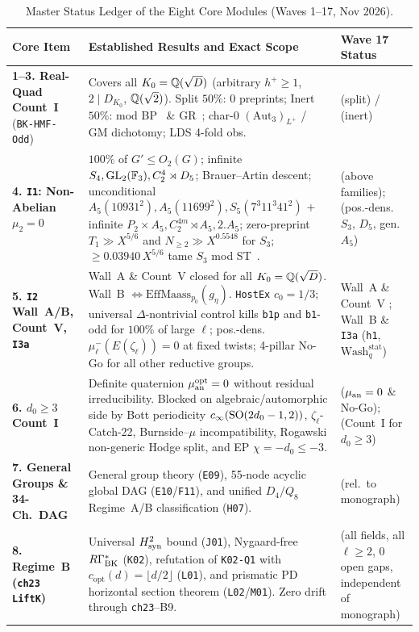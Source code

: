\begin{table}[ht]
\centering
\caption{Master Status Ledger of the Eight Core Modules (Waves 1--17, Nov 2026).}
\label{tab:1:master}
\footnotesize
\renewcommand{\arraystretch}{1.18}
\begin{tabular}{@{}>{\raggedright\arraybackslash}p{2.9cm}>{\raggedright\arraybackslash}p{7.8cm}>{\raggedright\arraybackslash}p{3.9cm}@{}}
\toprule
\textbf{Core Item} & \textbf{Established Results and Exact Scope} & \textbf{Wave 17 Status} \\
\midrule
\textbf{1--3. Real-Quad Count~I} (\texttt{BK-HMF-Odd}) & Covers all $K_0 = \mathbb{Q}(\sqrt{D})$ (arbitrary $h^+ \ge 1$, $2 \mid D_{K_0}$, $\mathbb{Q}(\sqrt{2})$). Split $50\%$: 0 preprints; Inert $50\%$: mod BP~\cite{BP2021} \& GR~\cite{GR2024}; char-0 $(\mathrm{Aut}_3)_{L^+}$ / GM dichotomy; LDS 4-fold obs. & \tagProved{} (split) / \tagMod{} (inert) \\
\textbf{4. \texttt{I1}: Non-Abelian $\mu_2 = 0$} & $100\%$ of $G' \le O_2(G)$; infinite $S_4, \mathrm{GL}_2(\mathbb{F}_3), C_2^4 \rtimes D_5$; Brauer--Artin descent; unconditional $A_5(10931^2), A_5(11699^2), S_5(7^3 11^3 41^2)$ + infinite $P_2 \times A_5, C_2^{4m} \rtimes A_5, 2.A_5$; zero-preprint $T_1 \gg X^{5/6}$ and $N_{\ge 2} \gg X^{0.5548}$ for $S_3$; $\ge 0.03940\,X^{5/6}$ tame $S_3$ mod ST~\cite{ST2025a,ST2025b}. & \tagProved{} (above families); \tagObs{} (pos.-dens.\ $S_3$, $D_5$, gen.\ $A_5$) \\
\textbf{5. \texttt{I2} Wall~A/B, Count~V, \texttt{I3a}} & Wall~A \& Count~V closed for all $K_0 = \mathbb{Q}(\sqrt{D})$. Wall~B $\iff \mathrm{EffMaass}_{p_0}(g_\eta)$. \texttt{HostEx} $c_0 = 1/3$; universal $\Delta$-nontrivial control kills \texttt{b1p} and \texttt{b1}-odd for $100\%$ of large $\ell$; pos.-dens.\ $\mu_\ell^-(E(\zeta_\ell)) = 0$ at fixed twists; 4-pillar No-Go for all other reductive groups. & Wall~A \& Count~V \tagProved{}; Wall~B \& \texttt{I3a} (\texttt{h1}, $\mathrm{Wash}_q^{\mathrm{stat}}$) \tagObs{} \\
\textbf{6. $d_0 \ge 3$ Count~I} & Definite quaternion $\mu_{\mathrm{an}}^{\mathrm{opt}} = 0$ without residual irreducibility. Blocked on algebraic/automorphic side by Bott periodicity $c_\infty(\mathrm{SO}(2d_0-1,2))$, $\zeta_\ell$-Catch-22, Burnside--$\mu$ incompatibility, Rogawski non-generic Hodge split, and EP $\chi = -d_0 \le -3$. & \tagProved{} ($\mu_{\mathrm{an}} = 0$ \& No-Go); \tagObs{} (Count~I for $d_0 \ge 3$) \\
\textbf{7. General Groups \& 34-Ch.\ DAG} & General group theory (\texttt{E09}), 55-node acyclic global DAG (\texttt{E10}/\texttt{F11}), and unified $D_4/Q_8$ Regime~A/B classification (\texttt{H07}). & \tagProved{} (rel.\ to monograph) \\
\textbf{8. Regime~B (\texttt{ch23} \texttt{LiftK})} & Universal $H^2_{\mathrm{syn}}$ bound (\texttt{J01}), Nygaard-free $R\Gamma_{\mathrm{BK}}^*$ (\texttt{K02}), refutation of \texttt{K02-Q1} with $c_{\mathrm{opt}}(d) = \lfloor d/2 \rfloor$ (\texttt{L01}), and prismatic PD horizontal section theorem (\texttt{L02}/\texttt{M01}). Zero drift through \texttt{ch23}--B9. & \tagProved{} (all fields, all $\ell \ge 2$, 0 open gaps, independent of monograph) \\
\bottomrule
\end{tabular}
\end{table}

